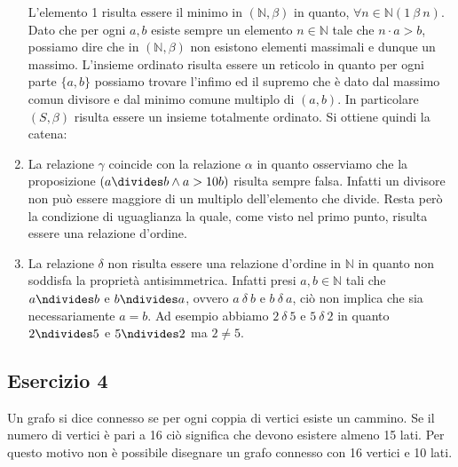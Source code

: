 \begin{enumerate}[label=(\textit{\roman*})]
\begin{enumerate}
	\end{enumerate}
	L'elemento 1 risulta essere il minimo in $(\mathbb{N},\beta)$ in quanto, $\forall n \in \mathbb{N}(1 \ \beta \ n)$. Dato che per ogni $a,b$ esiste sempre un elemento $n \in \mathbb{N}$ tale che $n \cdot a > b$, possiamo dire che in  $(\mathbb{N},\beta)$ non esistono elementi massimali e dunque un massimo. L'insieme ordinato risulta essere un reticolo in quanto per ogni parte $\{a,b\}$ possiamo trovare l'infimo ed il supremo che è dato dal massimo comun divisore e dal minimo comune multiplo di $(a,b)$. In particolare $(S,\beta)$ risulta essere un insieme totalmente ordinato. Si ottiene quindi la catena:
	\begin{center}
	\end{center}
	\item La relazione $\gamma$ coincide con la relazione $\alpha$ in quanto osserviamo che la proposizione $(a \divides b \land a > 10b)$ risulta sempre falsa. Infatti un divisore non può essere maggiore di un multiplo dell'elemento che divide. Resta però la condizione di uguaglianza la quale, come visto nel primo punto, risulta essere una relazione d'ordine.
	\item La relazione $\delta$ non risulta essere una relazione d'ordine in $\mathbb{N}$ in quanto non soddisfa la proprietà antisimmetrica. Infatti presi $a,b \in \mathbb{N}$ tali che $a \ndivides b$ e $b \ndivides a$, ovvero $a \ \delta \ b$ e $b \ \delta \ a$, ciò non implica che sia necessariamente $a=b$. Ad esempio abbiamo $2 \ \delta \ 5$ e $5 \ \delta \ 2$ in quanto $2 \ndivides 5$ e $5 \ndivides 2$ ma $2 \neq 5$.
\end{enumerate}

\subsection*{Esercizio 4}
Un grafo si dice connesso se per ogni coppia di vertici esiste un cammino. Se il numero di vertici è pari a 16 ciò significa che devono esistere almeno 15 lati. Per questo motivo non è possibile disegnare un grafo connesso con 16 vertici e 10 lati.
